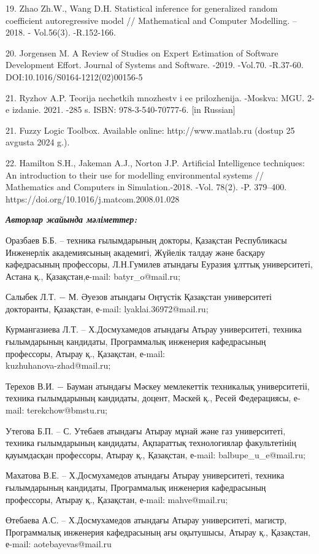 \begin{noparindent}
19. Zhao Zh.W., Wang D.H. Statistical inference for generalized random
coefficient autoregressive model // Mathematical and Computer Modelling.
-- 2018. - Vol.56(3). -R.152-166.

20. Jorgensen M. A Review of Studies on Expert Estimation of Software
Development Effort. Journal of Systems and Software. -2019. -Vol.70.
-R.37-60. DOI:10.1016/S0164-1212(02)00156-5

21. Ryzhov A.P. Teorija nechetkih mnozhestv i ee prilozhenija. -Moskva:
MGU. 2-e izdanie. 2021. -285 s. ISBN: 978-3-540-70777-6. {[}in
Russian{]}

21. Fuzzy Logic Toolbox. Available online: http://www.matlab.ru (dostup
25 avgusta 2024 g.).

22. Hamilton S.H., Jakeman A.J., Norton J.P. Artificial Intelligence
techniques: An introduction to their use for modelling environmental
systems // Mathematics and Computers in Simulation.-2018. -Vol. 78(2).
-P. 379--400. https://doi.org/10.1016/j.matcom.2008.01.028
\end{noparindent}

\emph{{\bfseries Авторлар жайында мәліметтер:}}
\begin{noparindent}

Оразбаев Б.Б. -- техника ғылымдарының докторы, Қазақстан Республикасы
Инженерлік академиясының академигі, Жүйелік талдау және басқару
кафедрасының профессоры, Л.Н.Гумилев атындағы Еуразия ұлттық
университеті, Астана қ., Қазақстан,е-mail: batyr\_o@mail.ru;

Салыбек Л.Т. − М. Әуезов атындағы Оңтүстік Қазақстан университеті
докторанты, Қазақстан, е-mail: lyaklai.36972@mail.ru;

Курмангазиева Л.Т. -- Х.Досмухамедов атындағы Атьрау университеті,
техника ғылымдарының кандидаты, Программалық инженерия кафедрасының
профессоры, Атырау қ., Қазақстан, е-mail: \\ kuzhuhanova-zhad@mail.ru;

Терехов В.И. − Бауман атындағы Мәскеу мемлекеттік техникалық
университетіі, техника ғылымдарының кандидаты, доцент, Мәскей қ., Ресей
Федерациясы, е-mail: terekchow@bmstu.ru;

Утегова Б.П. -- С. Утебаев атындағы Атырау мұнай және газ университеті,
техника ғылымдарының кандидаты, Ақпараттық технологиялар факультетінің
қауымдасқан профессоры, Атырау қ., Қазақстан, е-mail:
balbupe\_u\_e@mail.ru;

Махатова В.Е. -- Х.Досмухамедов атындағы Атырау университеті, техника
ғылымдарының кандидаты, Программалық инженерия кафедрасының профессоры,
Атырау қ., Қазақстан, е-mail: mahve@mail.ru;

Өтебаева А.С. -- Х.Досмухамедов атындағы Атырау университеті, магистр,
Программалық инженерия кафедрасының ағы оқытушысы, Атырау қ., Қазақстан,
е-mail: aotebayevas@mail.ru
\end{noparindent}

